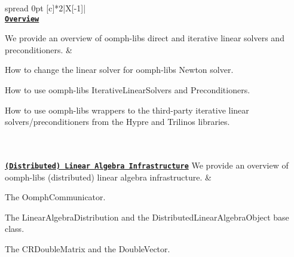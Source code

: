 \tabulinesep=1mm
\begin{longtabu} spread 0pt [c]{*{2}{|X[-1]}|}
\hline
{}\\
\href{../../linear_solvers/html/index.html}{\tt {\bfseries  Overview}}

We provide an overview of {\ttfamily oomph-\/lib\textquotesingle{}s} direct and iterative linear solvers and preconditioners.  &
\begin{DoxyItemize}
\item How to change the linear solver for {\ttfamily oomph-\/lib\textquotesingle{}s} Newton solver.
\item How to use {\ttfamily oomph-\/lib\textquotesingle{}s} {\ttfamily Iterative\+Linear\+Solvers} and {\ttfamily Preconditioners}.
\item How to use {\ttfamily oomph-\/lib\textquotesingle{}s} wrappers to the third-\/party iterative linear solvers/preconditioners from the {\ttfamily Hypre} and {\ttfamily Trilinos} libraries.
\end{DoxyItemize}

\\
\\
\href{../../mpi/distributed_linear_algebra_infrastructure/html/index.html}{\tt {\bfseries  (Distributed) Linear Algebra Infrastructure}} We provide an overview of {\ttfamily oomph-\/lib\textquotesingle{}s} (distributed) linear algebra infrastructure.  &
\begin{DoxyItemize}
\item The {\ttfamily Oomph\+Communicator}.
\item The {\ttfamily Linear\+Algebra\+Distribution} and the {\ttfamily Distributed\+Linear\+Algebra\+Object} base class.
\item The {\ttfamily C\+R\+Double\+Matrix} and the {\ttfamily Double\+Vector}.
\end{DoxyItemize}


\end{longtabu}
